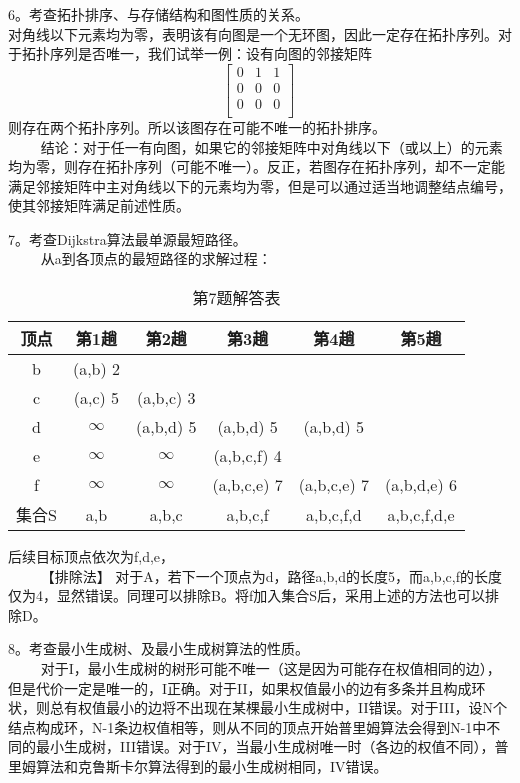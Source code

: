 6。考查拓扑排序、与存储结构和图性质的关系。\\
对角线以下元素均为零，表明该有向图是一个无环图，因此一定存在拓扑序列。对于拓扑序列是否唯一，我们试举一例：设有向图的邻接矩阵
\begin{equation}
\begin{bmatrix}
 0 & 1 & 1 \\
 0 & 0 & 0 \\
 0 & 0 & 0 \\
\end{bmatrix}
~
\end{equation}
则存在两个拓扑序列。所以该图存在可能不唯一的拓扑排序。\\
$\qquad$ 结论：对于任一有向图，如果它的邻接矩阵中对角线以下（或以上）的元素均为零，则存在拓扑序列（可能不唯一）。反正，若图存在拓扑序列，却不一定能满足邻接矩阵中主对角线以下的元素均为零，但是可以通过适当地调整结点编号，使其邻接矩阵满足前述性质。

7。考查Dijkstra算法最单源最短路径。\\
$\qquad$ 从a到各顶点的最短路径的求解过程：\\
\begin{table}[ht]
\centering
\caption{第7题解答表}\label{tab_CSN12_5}
\begin{tabular}{|c|c|c|c|c|c|}
\hline
顶点 & 第1趟 & 第2趟 & 第3趟 & 第4趟 & 第5趟 \\
\hline
b & (a,b) 2 &  &  &  &  \\
\hline
c & (a,c) 5 & (a,b,c) 3 &  &  &  \\
\hline
d & $\infty$ & (a,b,d) 5 & (a,b,d) 5 & (a,b,d) 5 &  \\
\hline
e & $\infty$ & $\infty$ & (a,b,c,f) 4 &  &  \\
\hline
f & $\infty$  & $\infty$ & (a,b,c,e) 7 & (a,b,c,e) 7 & (a,b,d,e) 6 \\
\hline
集合S & {a,b} & {a,b,c} & {a,b,c,f} & {a,b,c,f,d} & {a,b,c,f,d,e} \\
\hline
\end{tabular}
\end{table}
后续目标顶点依次为f,d,e， \\
$\qquad$ 【排除法】 对于A，若下一个顶点为d，路径a,b,d的长度5，而a,b,c,f的长度仅为4，显然错误。同理可以排除B。将f加入集合S后，采用上述的方法也可以排除D。

8。考查最小生成树、及最小生成树算法的性质。\\
$\qquad$ 对于I，最小生成树的树形可能不唯一（这是因为可能存在权值相同的边），但是代价一定是唯一的，I正确。对于II，如果权值最小的边有多条并且构成环状，则总有权值最小的边将不出现在某棵最小生成树中，II错误。对于III，设N个结点构成环，N-1条边权值相等，则从不同的顶点开始普里姆算法会得到N-1中不同的最小生成树，III错误。对于IV，当最小生成树唯一时（各边的权值不同），普里姆算法和克鲁斯卡尔算法得到的最小生成树相同，IV错误。

